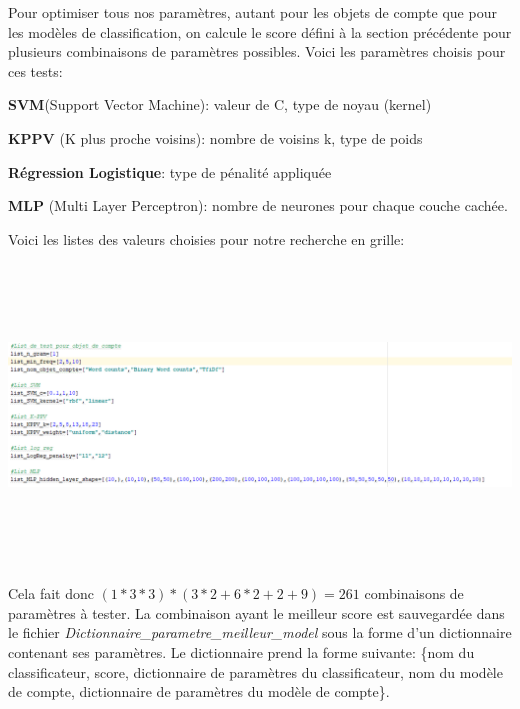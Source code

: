 Pour optimiser tous nos paramètres, autant pour les objets de compte que pour les modèles de classification, on calcule le score défini à la section précédente pour plusieurs combinaisons de paramètres possibles. Voici les paramètres choisis pour ces tests:

\begin{description}
\item \textbf{SVM}(Support Vector Machine): valeur de C, type de noyau (kernel)
\item \textbf{KPPV} (K plus proche voisins): nombre de voisins k, type de poids
\item \textbf{Régression Logistique}: type de pénalité appliquée
\item \textbf{MLP} (Multi Layer Perceptron): nombre de neurones pour chaque couche cachée.
\end{description}
Voici les listes des valeurs choisies pour notre recherche en grille:

\includegraphics[width=\linewidth,height=8cm]{images/list_param}

Cela fait donc $(1*3*3) *(3*2 + 6*2 + 2 + 9)=261$ combinaisons de paramètres à tester. La combinaison ayant le meilleur score est sauvegardée dans le fichier \emph{Dictionnaire\_parametre\_meilleur\_model} sous la forme d'un dictionnaire contenant ses paramètres. 
Le dictionnaire prend la forme suivante: \{nom du classificateur, score, dictionnaire de paramètres du classificateur, nom du modèle de compte, dictionnaire de paramètres du modèle de compte\}.